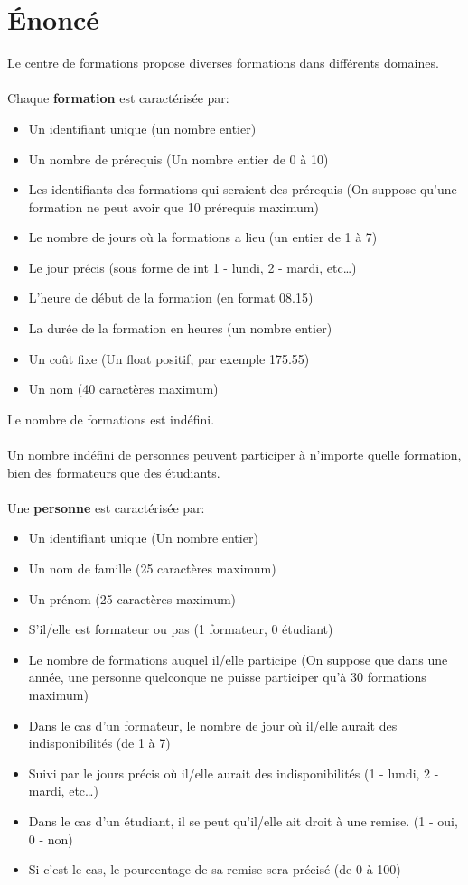 \documentclass[11pt]{article}
\begin{document}
\newpage
\section{Énoncé}
Le centre de formations propose diverses formations dans différents domaines.\\\\
Chaque \textbf{formation} est caractérisée par:
\begin{itemize}
\item Un identifiant unique (un nombre entier)
\item Un nombre de prérequis (Un nombre entier de 0 à 10)
\item Les identifiants des formations qui seraient des prérequis (On suppose qu'une formation ne peut avoir que 10 prérequis maximum)
\item Le nombre de jours où la formations a lieu (un entier de 1 à 7)
\item Le jour précis (sous forme de int 1 - lundi, 2 - mardi, etc\ldots)
\item L'heure de début de la formation (en format 08.15)
\item La durée de la formation en heures (un nombre entier)
\item Un coût fixe (Un float positif, par exemple 175.55)
\item Un nom (40 caractères maximum)
\end{itemize}
Le nombre de formations est indéfini.\\\\
Un nombre indéfini de personnes peuvent participer à n'importe quelle formation, bien des formateurs que des étudiants.\\\\
Une \textbf{personne} est caractérisée par:
\begin{itemize}
\item Un identifiant unique (Un nombre entier)
\item Un nom de famille (25 caractères maximum)
\item Un prénom (25 caractères maximum)
\item S'il/elle est formateur ou pas (1 formateur, 0 étudiant)
\item Le nombre de formations auquel il/elle participe (On suppose que dans une année, une personne quelconque ne puisse participer qu'à 30 formations maximum)
\item Dans le cas d'un formateur, le nombre de jour où il/elle aurait des indisponibilités (de 1 à 7)
\item Suivi par le jours précis où il/elle aurait des indisponibilités (1 - lundi, 2 - mardi, etc\ldots) 
\item Dans le cas d'un étudiant, il se peut qu'il/elle ait droit à une remise. (1 - oui, 0 - non)
\item Si c'est le cas, le pourcentage de sa remise sera précisé (de 0 à 100)
\end{itemize}\leavevmode\newline
\end{document}
